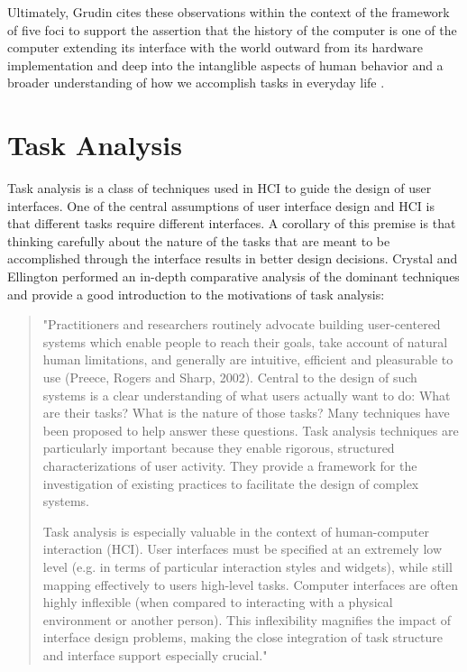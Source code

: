 Ultimately, Grudin cites these observations within the context of the framework of five foci to support the assertion that the history of the computer is one of the computer extending its interface with the world outward from its hardware implementation and deep into the intanglible aspects of human behavior and a broader understanding of how we accomplish tasks in everyday life \cite{continuity1990}.

\section{Task Analysis}

Task analysis is a class of techniques used in HCI to guide the design of user interfaces. One of the central assumptions of user interface design and HCI is that different tasks require different interfaces. A corollary of this premise is that thinking carefully about the nature of the tasks that are meant to be accomplished through the interface results in better design decisions. Crystal and Ellington performed an in-depth comparative analysis of the dominant techniques and provide a good introduction to the motivations of task analysis:

\begin{quote}
"Practitioners and researchers routinely advocate building user-centered systems which enable people to reach their goals, take account of natural human limitations, and generally are intuitive, efficient and pleasurable to use (Preece, Rogers and Sharp, 2002). Central to the design of such systems is a clear understanding of what users actually want to do: What are their tasks? What is the nature of those tasks? Many techniques have been proposed to help answer these questions. Task analysis techniques are particularly important because they enable rigorous, structured characterizations of user activity. They provide a framework for the investigation of existing practices to facilitate the design of complex systems.

Task analysis is especially valuable in the context of human-computer interaction (HCI). User interfaces must be specified at an extremely low level (e.g. in terms of particular interaction styles and widgets), while still mapping effectively to users high-level tasks. Computer interfaces are often highly inflexible (when compared to interacting with a physical environment or another person). This inflexibility magnifies the impact of interface design problems, making the close integration of task structure and interface support especially crucial." \cite{crystal2004}
\end{quote}

